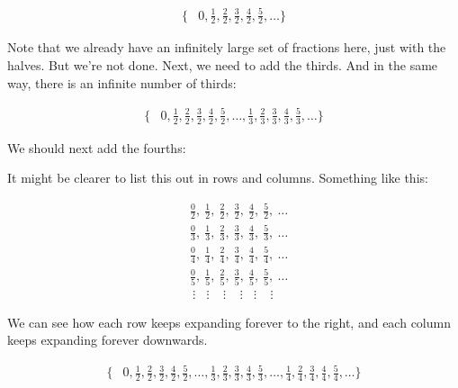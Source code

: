 \documentclass[../../../main.tex]{subfiles}
\begin{document}
\begin{align*}
  \{ &0, \frac{1}{2}, \frac{2}{2}, \frac{3}{2}, \frac{4}{2}, \frac{5}{2}, \ldots \}
\end{align*}

Note that we already have an infinitely large set of fractions here, just with the halves. But we're not done. Next, we need to add the thirds. And in the same way, there is an infinite number of thirds:

\begin{align*}
  \{ &0, \frac{1}{2}, \frac{2}{2}, \frac{3}{2}, \frac{4}{2}, \frac{5}{2}, \ldots, \frac{1}{3}, \frac{2}{3}, \frac{3}{3}, \frac{4}{3}, \frac{5}{3}, \ldots \}
\end{align*}

We should next add the fourths:

\begin{aside}
  \begin{remark}
    It might be clearer to list this out in rows and columns. Something like this:
    
    \begin{align*}
      &\frac{0}{2},~\frac{1}{2},~\frac{2}{2},~\frac{3}{2},~\frac{4}{2},~\frac{5}{2},~\ldots \\
      &\frac{0}{3},~\frac{1}{3},~\frac{2}{3},~\frac{3}{3},~\frac{4}{3},~\frac{5}{3},~\ldots \\
      &\frac{0}{4},~\frac{1}{4},~\frac{2}{4},~\frac{3}{4},~\frac{4}{4},~\frac{5}{4},~\ldots \\
      &\frac{0}{5},~\frac{1}{5},~\frac{2}{5},~\frac{3}{5},~\frac{4}{5},~\frac{5}{5},~\ldots \\
      &~\vdots~~~~\vdots~~~~~\vdots~~~~~\vdots~~~~\vdots~~~~~\vdots
    \end{align*}
    
    We can see how each row keeps expanding forever to the right, and each column keeps expanding forever downwards.
  \end{remark}
\end{aside}

\begin{align*}
  \{ &0, \frac{1}{2}, \frac{2}{2}, \frac{3}{2}, \frac{4}{2}, \frac{5}{2}, \ldots, \frac{1}{3}, \frac{2}{3}, \frac{3}{3}, \frac{4}{3}, \frac{5}{3}, \ldots, \frac{1}{4}, \frac{2}{4}, \frac{3}{4}, \frac{4}{4}, \frac{5}{4}, \ldots \}
\end{align*}
\end{document}
